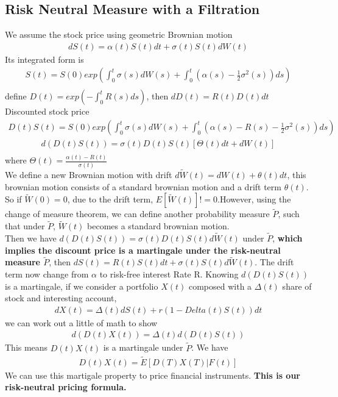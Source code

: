\documentclass[a4paper]{article}
\begin{document}
\subsection{Risk Neutral Measure with a Filtration}
We assume the stock price using geometric Brownian motion\\
\begin{align*}
dS(t) = \alpha(t) S(t) dt + \sigma(t) S(t) d W(t)
\end{align*}
Its integrated form is\\
\begin{align*}
	S(t) = S(0) exp(\int _0 ^t \sigma(s) dW(s) + \int _0 ^t (\alpha(s) - \frac{1}{2} \sigma^2(s)) ds)\\
\end{align*}
define $D(t) = exp(-\int_0^t R(s) ds) $, then $dD(t) = R(t)D(t)dt$\\
Discounted stock price\\
\begin{align*}
	D(t)S(t) = S(0) exp(\int_0^t \sigma(s) dW(s) + \int_0^t (\alpha(s) - R(s) - \frac{1}{2} \sigma^2(s)) ds)
\end{align*}
\begin{align*}
	d(D(t) S(t)) = \sigma(t) D(t) S(t) [\Theta(t) dt + dW(t)]\\
\end{align*}
where $\Theta(t) = \frac{\alpha(t) -R(t)}{\sigma(t)}$\\
We define a new Brownian motion with drift $d\tilde W(t) = dW(t) + \theta(t) dt$, this brownian motion consists of a standard brownian motion and a drift term $\theta(t)$. So if $\tilde W(0) = 0$, due to the drift term, $E[\tilde W(t)] != 0$.However, using the change of measure theorem, we can define another probability measure $\tilde P$, such that under $\tilde P$, $\tilde W(t)$ becomes a standard brownian motion.\\
Then we have $d(D(t)S(t)) = \sigma(t) D(t) S(t) d\tilde W(t)$ under $\tilde P$, {\bf which implies the discount price is a martingale under the risk-neutral measure $\tilde P$}, then $dS(t) = R(t) S(t) dt + \sigma(t) S(t) d  \tilde W(t)$. The drift term now change from $\alpha$ to risk-free interest Rate R. Knowing $d(D(t)S(t))$ is a martingale, if we consider a portfolio $X(t)$ composed with a $\Delta(t)$ share of stock and interesting account, 
\begin{align*}
	d X(t) = \Delta(t) dS(t) + r(1 - Delta(t)S(t))dt
\end{align*}
we can work out a little of math to show
\begin{align*}
	d(D(t)X(t)) = \Delta(t) d(D(t)S(t))
\end{align*}
This means $D(t)X(t)$ is a martingale under $\tilde P$. We have
\begin{align*}
	D(t)X(t) = \tilde E [D(T) X(T) | F(t)]
\end{align*}
We can use this martigale property to price financial instruments.
{\bf This is our risk-neutral pricing formula.}
\end{document}
